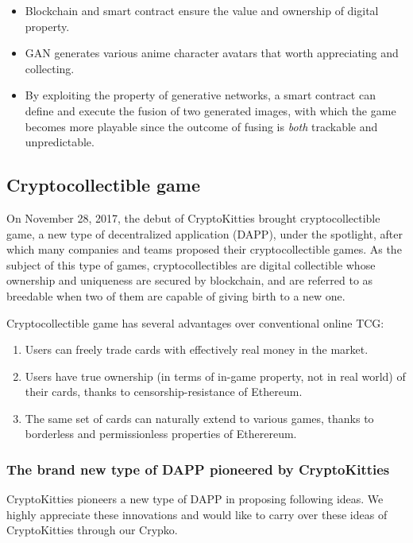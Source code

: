 \documentclass[b5paper]{article}
\begin{document}
\begin{itemize}
\item Blockchain and smart contract ensure the value and ownership of digital property.
\item GAN generates various anime character avatars that worth appreciating and collecting.
\item By exploiting the property of generative networks, a smart contract can define and execute the fusion of two generated images, with which the game becomes more playable since the outcome of fusing is \emph{both} trackable and unpredictable. 
\end{itemize}

\subsection{Cryptocollectible game}

On November 28, 2017, the debut of CryptoKitties\cite{cryptokitties} brought cryptocollectible game, a new type of decentralized application (DAPP), under the spotlight, after which many companies and teams proposed their cryptocollectible games\cite{cryptomons,cryptocountries,cryptopets,cryptoarts,cryptolandmarks,cryptofighters,etheremon,etherwaifu}. As the subject of this type of games, cryptocollectibles are digital collectible whose ownership and uniqueness are secured by blockchain, and are referred to as breedable when two of them are capable of giving birth to a new one.

Cryptocollectible game has several advantages over conventional online TCG:
\begin{enumerate}
\item Users can freely trade cards with effectively real money in the market.
\item Users have true ownership (in terms of in-game property, not in real world) of their cards, thanks to censorship-resistance of Ethereum.
\item The same set of cards can naturally extend to various games, thanks to borderless and permissionless properties of Etherereum.
\end{enumerate}

\subsubsection{The brand new type of DAPP pioneered by CryptoKitties}

CryptoKitties pioneers a new type of DAPP in proposing following ideas. 
We highly appreciate these innovations and would like to carry over these ideas of CryptoKitties through our Crypko.
\end{document}

